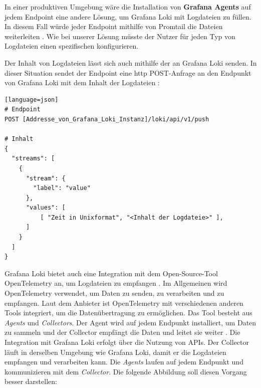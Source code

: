 In einer produktiven Umgebung wäre die Installation von \textbf{Grafana Agents} auf jedem \gls{Endpoint} eine andere Lösung, um Grafana Loki mit Logdateien zu füllen. In diesem Fall würde jeder \gls{Endpoint} mithilfe von Promtail die Dateien weiterleiten \citep{Grafana_Agents}. Wie bei unserer Lösung müsste der Nutzer für jeden Typ von Logdateien einen spezifischen  konfigurieren.


Der Inhalt von Logdateien lässt sich auch mithilfe der \textbf{} an Grafana Loki senden. In dieser Situation sendet der \gls{Endpoint} eine \gls{http} POST-Anfrage an den Endpunkt von Grafana Loki mit dem Inhalt der Logdateien \citep{Grafana_api}:


{
\begin{lstlisting}[frame=single][language=json]
# Endpoint 
POST [Addresse_von_Grafana_Loki_Instanz]/loki/api/v1/push

# Inhalt
{
  "streams": [
    {
      "stream": {
        "label": "value"
      },
      "values": [
          [ "Zeit in Unixformat", "<Inhalt der Logdateie>" ],
      ]
    }
  ]
}
\end{lstlisting}
}

Grafana Loki bietet auch eine Integration mit dem Open-Source-Tool OpenTelemetry an, um Logdateien zu empfangen \citep{Grafana_opentelemetry}. Im Allgemeinen wird OpenTelemetry verwendet, um Daten zu senden, zu verarbeiten und zu empfangen. Laut dem Anbieter ist OpenTelemetry mit verschiedenen anderen Tools integriert, um die Datenübertragung zu ermöglichen. Das Tool besteht aus \textit{Agents} und \textit{Collectors}. Der Agent wird auf jedem Endpunkt installiert, um Daten zu sammeln und der Collector empfängt die Daten und leitet sie weiter \citep{Grafana_opentelemetry}. Die Integration mit Grafana Loki erfolgt über die Nutzung von APIs. Der Collector läuft in derselben Umgebung wie Grafana Loki, damit er die Logdateien empfangen und verarbeiten kann. Die \textit{Agents} laufen auf jedem Endpunkt und kommunizieren mit dem \textit{Collector}. Die folgende Abbildung soll diesen Vorgang besser darstellen:

